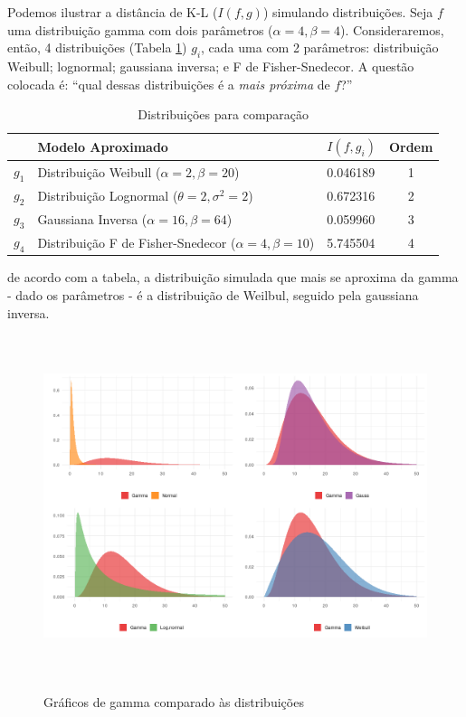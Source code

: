 Podemos ilustrar a distância de K-L ($I(f, g)$) simulando distribuições. Seja $f$ uma distribuição gamma com dois parâmetros ($\alpha = 4, \beta = 4$). Consideraremos, então, 4 distribuições (Tabela \ref{ref:tabeladist}) $g_i$, cada uma com 2 parâmetros: distribuição Weibull; lognormal; gaussiana inversa; e F de Fisher-Snedecor. A questão colocada é: ``qual dessas distribuições é a \textit{mais próxima} de $f$?'' \cite[p. 54]{burnham2002practical}

\begin{table}[!h]
\centering
\caption{Distribuições para comparação}
\begin{tabular}{lllc}
\hline
      & Modelo Aproximado                                            & $I(f, g_i)$ & Ordem \\ \hline
$g_1$ & Distribuição Weibull ($\alpha = 2, \beta = 20$)              & 0.046189    & 1     \\
$g_2$ & Distribuição Lognormal ($\theta = 2, \sigma^2 = 2$)          & 0.672316    & 2     \\
$g_3$ & Gaussiana Inversa ($\alpha = 16, \beta = 64$)                & 0.059960    & 3     \\
$g_4$ & Distribuição F de Fisher-Snedecor ($\alpha = 4, \beta = 10$) & 5.745504    & 4     \\ \hline
\end{tabular}
\label{ref:tabeladist}
\end{table}

de acordo com a tabela, a distribuição simulada que mais se aproxima da gamma - dado os parâmetros - é a distribuição de Weilbul, seguido pela gaussiana inversa.
\begin{figure}[!h]
    \centering
    \caption{Gráficos de gamma comparado às distribuições}
    \includegraphics[width=\textwidth, height=10cm]{capitulos/figures/graf_gamma_ggplot.pdf}
    \label{fig:my_label}
\end{figure}

